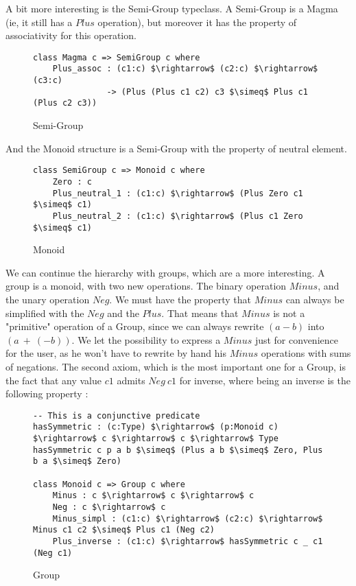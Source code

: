 A bit more interesting is the Semi-Group typeclass. A Semi-Group is a Magma (ie, it still has a $Plus$ operation), but moreover it has the property of associativity for this operation.

\begin{figure}[H]
\figrule
\begin{center}
\begin{lstlisting}
class Magma c => SemiGroup c where
    Plus_assoc : (c1:c) $\rightarrow$ (c2:c) $\rightarrow$ (c3:c) 
               -> (Plus (Plus c1 c2) c3 $\simeq$ Plus c1 (Plus c2 c3))
\end{lstlisting}
\end{center}
\caption{Semi-Group}
\label{SemiGroup}
\figrule
\end{figure}

And the Monoid structure is a Semi-Group with the property of neutral element.

\begin{figure}[H]
\figrule
\begin{center}
\begin{lstlisting}
class SemiGroup c => Monoid c where
    Zero : c    
    Plus_neutral_1 : (c1:c) $\rightarrow$ (Plus Zero c1 $\simeq$ c1)    
    Plus_neutral_2 : (c1:c) $\rightarrow$ (Plus c1 Zero $\simeq$ c1)
\end{lstlisting}
\end{center}
\caption{Monoid}
\label{Monoid}
\figrule
\end{figure}
We can continue the hierarchy with groups, which are a more interesting.
A group is a monoid, with two new operations. The binary operation $Minus$, and the unary operation $Neg$. We must have the property that $Minus$ can always be simplified with the $Neg$ and the $Plus$. That means that $Minus$ is not a "primitive" operation of a Group, since we can always rewrite $(a-b)$ into $(a\ +\ (-b))$. We let the possibility to express a $Minus$ just for convenience for the user, as he won't have to rewrite by hand his $Minus$ operations with sums of negations.
The second axiom, which is the most important one for a Group, is the fact that any value $c1$ admits $Neg\ c1$ for inverse, where being an inverse is the following property :

\begin{figure}[H]
\figrule
\begin{center}
\begin{lstlisting}
-- This is a conjunctive predicate
hasSymmetric : (c:Type) $\rightarrow$ (p:Monoid c) $\rightarrow$ c $\rightarrow$ c $\rightarrow$ Type
hasSymmetric c p a b $\simeq$ (Plus a b $\simeq$ Zero, Plus b a $\simeq$ Zero)    
  
class Monoid c => Group c where
    Minus : c $\rightarrow$ c $\rightarrow$ c
    Neg : c $\rightarrow$ c
    Minus_simpl : (c1:c) $\rightarrow$ (c2:c) $\rightarrow$ Minus c1 c2 $\simeq$ Plus c1 (Neg c2) 
    Plus_inverse : (c1:c) $\rightarrow$ hasSymmetric c _ c1 (Neg c1)
\end{lstlisting}
\end{center}
\caption{Group}
\label{Group}
\figrule
\end{figure}


